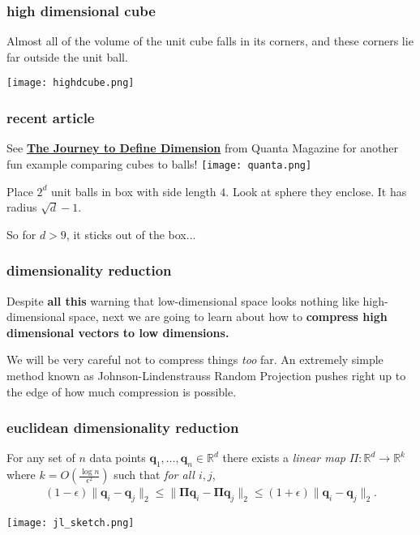 \documentclass[compress]{beamer}
\newcommand{\bs}[1]{\boldsymbol{#1}}
\newcommand{\bv}[1]{\mathbf{#1}}
\newcommand{\R}{\mathbb{R}}
\begin{document}
\begin{frame}
	\frametitle{high dimensional cube}
	Almost all of the volume of the unit cube falls in its corners, and these corners lie far outside the unit ball. 
\begin{center}
\texttt{[image: highdcube.png]}
\end{center}
\end{frame}

\begin{frame}
	\frametitle{recent article}
	\begin{center}
	See \textbf{\textcolor{blue}{\href{https://www.quantamagazine.org/a-mathematicians-guided-tour-through-high-dimensions-20210913/}{The Journey to Define Dimension}}} from Quanta Magazine for another fun example comparing cubes to balls!
	\vspace{1em}
	\texttt{[image: quanta.png]}
	\end{center}
Place $2^d$ unit balls in box with side length $4$. Look at sphere they enclose. It has radius $\sqrt{d}-1$. 
\begin{center}
So for $d > 9$, it sticks out of the box...
\end{center}
\end{frame}

\begin{frame}
	\frametitle{dimensionality reduction}
	Despite \textbf{all this} warning that low-dimensional space looks nothing like high-dimensional space, next we are going to learn about how to \textbf{compress high dimensional vectors to low dimensions.} 
	
	We will be very careful not to compress things \emph{too} far. An extremely simple method known as Johnson-Lindenstrauss Random Projection pushes right up to the edge of how much compression is possible. 
\end{frame}


\begin{frame}
	\frametitle{euclidean dimensionality reduction}
	\begin{lemma}
		For any set of $n$ data points $\bv{q}_1,\ldots, \bv{q}_n \in \R^d$ there exists a \emph{linear map} $\Pi: \R^d \rightarrow \R^k$ where $k = O\left(\frac{\log n}{\epsilon^2}\right)$ such that \emph{for all $i,j$},
		\begin{align*}
			(1-\epsilon)\|\bv{q}_i - \bv{q}_j\|_2 \leq \|\bs{\Pi}\bv{q}_i - \bs{\Pi}\bv{q}_j\|_2 \leq (1+\epsilon)\|\bv{q}_i - \bv{q}_j\|_2.
		\end{align*}
	\end{lemma}
	\begin{center}
		\texttt{[image: jl\_sketch.png]}
	\end{center}
\end{frame}
\end{document}
